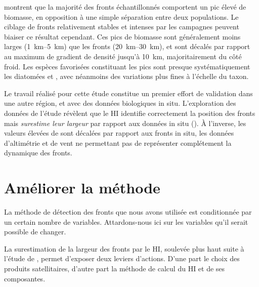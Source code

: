 \Textcite{mangolte_2023} montrent que la majorité des fronts échantillonnés comportent un pic élevé de biomasse, en opposition à une simple séparation entre deux populations.
Le ciblage de fronts relativement stables et intenses par les campagnes peuvent biaiser ce résultat cependant.
Ces pics de biomasse sont généralement moins larges (\qtyrange{1}{5}{\km}) que les fronts (\qtyrange{20}{30}{\km}), et sont décalés par rapport au maximum de gradient de densité jusqu'à \qty{10}{\km}, majoritairement du côté froid.
Les espèces favorisées constituant les pics sont presque systématiquement les diatomées et , avec néanmoins des variations plus fines à l'échelle du taxon.

Le travail réalisé pour cette étude  constitue un premier effort de validation dans une autre région, et avec des données biologiques in situ.
L'exploration des données de l'étude révèlent que le HI identifie correctement la position des fronts mais \emph{surestime leur largeur} par rapport aux données in situ ().
À l'inverse, les valeurs élevées de  sont décalées par rapport aux fronts in situ, les données d'altimétrie et de vent ne permettant pas de représenter complétement la dynamique des fronts.

\begin{figure}
  \centering
  \label{fig:comp-hi-fsle}
\end{figure}

\section{Améliorer la méthode}

La méthode de détection des fronts que nous avons utilisée  est conditionnée par un certain nombre de variables.
Attardons-nous ici sur les variables qu'il serait possible de changer.

La surestimation de la largeur des fronts par le HI, soulevée plus haut suite à l'étude de \textcite{mangolte_2023}, permet d'exposer deux leviers d'actions. D'une part le choix des produits satellitaires, d'autre part la méthode de calcul du HI et de ses composantes.

